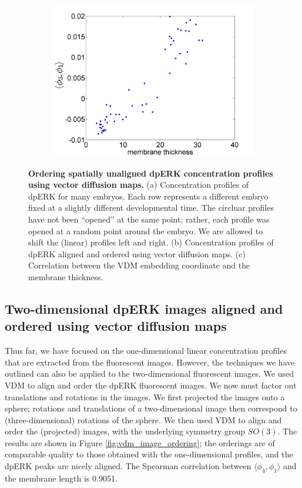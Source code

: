 \documentclass[10pt]{article}
\begin{document}
\begin{figure}[!ht]
\begin{subfigure}{0.3\textwidth}
\includegraphics[width=\textwidth]{VDM_time_corr}
\caption{}
\end{subfigure}
\caption{{\bf Ordering spatially unaligned dpERK concentration profiles using vector diffusion maps.} (a) Concentration profiles of dpERK for many embryos. Each row represents a different embryo fixed at a slightly different developmental time. The circluar profiles have not been ``opened'' at the same point; rather, each profile was opened at a random point around the embryo. We are allowed to shift the (linear) profiles left and right.
(b) Concentration profiles of dpERK aligned and ordered using vector diffusion maps.
(c) Correlation between the VDM embedding coordinate and the membrane thickness.}
\label{fig:vdm_ordering}
\end{figure}

\subsection*{Two-dimensional dpERK images aligned and ordered using vector diffusion maps}

Thus far, we have focused on the one-dimensional linear concentration profiles that are extracted from the fluorescent images.
%
However, the techniques we have outlined can also be applied to the two-dimensional fluorescent images. 
%
We used VDM to align and order the dpERK fluorescent images. 
%
We now must factor out translations and rotations in the images. 
%
We first projected the images onto a sphere;
rotations and translations of a two-dimensional image then correspond to (three-dimensional) rotations of the sphere.
%
We then used VDM to align and order the (projected) images, with the underlying symmetry group $SO(3)$. 
%
The results are shown in Figure \ref{fig:vdm_image_ordering};
the orderings are of comparable quality to those obtained with the one-dimensional profiles, and the dpERK peaks are nicely aligned.
%
The Spearman correlation between $\langle \phi_4, \phi_1 \rangle$ and the membrane length is 0.9051.
\end{document}
